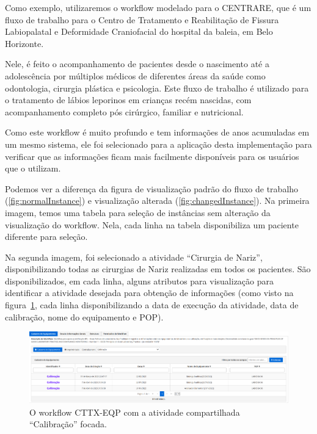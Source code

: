 Como exemplo, utilizaremos o workflow modelado para o CENTRARE, que é um fluxo de trabalho para o Centro de Tratamento e Reabilitação de Fissura Labiopalatal e Deformidade Craniofacial do hospital da baleia, em Belo Horizonte.

Nele, é feito o acompanhamento de pacientes desde o nascimento até a adolescência por múltiplos médicos de diferentes áreas da saúde como odontologia, cirurgia plástica e psicologia. Este fluxo de trabalho é utilizado para o tratamento de lábios leporinos em crianças recém nascidas, com acompanhamento completo pós cirúrgico, familiar e nutricional.

Como este workflow é muito profundo e tem informações de anos acumuladas em um mesmo sistema, ele foi selecionado para a aplicação desta implementação para verificar que as informações ficam mais facilmente disponíveis para os usuários que o utilizam.

Podemos ver a diferença da figura de visualização padrão do fluxo de trabalho (\ref{fig:normalInstance}) e visualização alterada (\ref{fig:changedInstance}). Na primeira imagem, temos uma tabela para seleção de instâncias sem alteração da visualização do workflow. Nela, cada linha na tabela disponibiliza um paciente diferente para seleção.

Na segunda imagem, foi selecionado a atividade ``Cirurgia de Nariz'', disponibilizando todas as cirurgias de Nariz realizadas em todos os pacientes. São disponibilizados, em cada linha, alguns atributos para visualização para identificar a atividade desejada para obtenção de informações (como visto na figura~\ref{fig:cttx_eqp_calibracao_focada}, cada linha disponibilizando a data de execução da atividade, data de calibração, nome do equipamento e POP).

\begin{figure}
    \centering
    \includegraphics[width=1\textwidth]{imgs/CTTX-EQP/cttx_eqp_calibracao_focada.png}
    \caption{O workflow CTTX-EQP com a atividade compartilhada ``Calibração'' focada.}
    \label{fig:cttx_eqp_calibracao_focada}
\end{figure}


